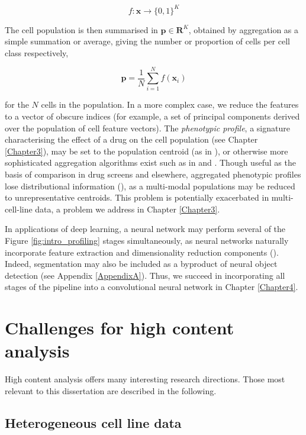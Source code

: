 \begin{equation}
f : \mathbf{x} \to \{0, 1\}^K
\end{equation}

The cell population is then summarised in $\mathbf{p} \in \mathbf{R}^K$, obtained by aggregation as a simple summation or average, giving the number or proportion of cells per cell class respectively,

\begin{equation}
\mathbf{p} = \frac{1}{N}\sum_{i=1}^N f(\mathbf{x}_i)
\end{equation}

for the $N$ cells in the population. In a more complex case, we reduce the features to a vector of obscure indices (for example, a set of principal components derived over the population of cell feature vectors). The \emph{phenotypic profile}, a signature characterising the effect of a drug on the cell population (see Chapter \ref{Chapter3}), may be set to the population centroid (as in \cite{adams2006compound}), or otherwise more sophisticated aggregation algorithms exist such as in \cite{perlman2004multidimensional} and \cite{loo2007image}. Though useful as the basis of comparison in drug screens and elsewhere, aggregated phenotypic profiles lose distributional information (\cite{altschuler2010cellular}), as a multi-modal populations may be reduced to unrepresentative centroids. This problem is potentially exacerbated in multi-cell-line data, a problem we address in Chapter \ref{Chapter3}.

In applications of deep learning, a neural network may perform several of the Figure \ref{fig:intro_profiling} stages simultaneously, as neural networks naturally incorporate feature extraction and dimensionality reduction components (\cite{sommer2017deep}). Indeed, segmentation may also be included as a byproduct of neural object detection (see Appendix \ref{AppendixA}). Thus, we succeed in incorporating all stages of the pipeline into a convolutional neural network in Chapter \ref{Chapter4}.

\section{Challenges for high content analysis}

High content analysis offers many interesting research directions. Those most relevant to this dissertation are described in the following.

\subsection{Heterogeneous cell line data}

